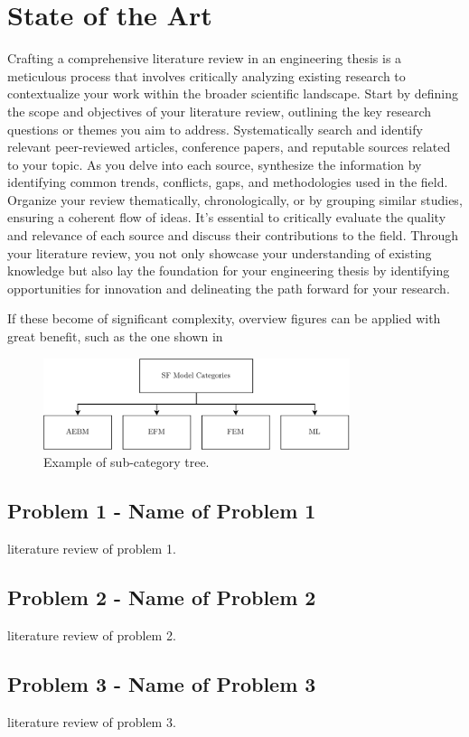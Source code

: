 \chapter{State of the Art} \label{ch:state-of-the-art}

Crafting a comprehensive literature review in an engineering thesis is a meticulous process that involves critically analyzing existing research to contextualize your work within the broader scientific landscape. Start by defining the scope and objectives of your literature review, outlining the key research questions or themes you aim to address. Systematically search and identify relevant peer-reviewed articles, conference papers, and reputable sources related to your topic. As you delve into each source, synthesize the information by identifying common trends, conflicts, gaps, and methodologies used in the field. Organize your review thematically, chronologically, or by grouping similar studies, ensuring a coherent flow of ideas. It's essential to critically evaluate the quality and relevance of each source and discuss their contributions to the field. Through your literature review, you not only showcase your understanding of existing knowledge but also lay the foundation for your engineering thesis by identifying opportunities for innovation and delineating the path forward for your research. \medskip

If these become of significant complexity, overview figures can be applied with great benefit, such as the one shown in~

\begin{figure}[h]
	\begin{small}
		\begin{center}
			\includegraphics[width=0.8\textwidth]{img/sf-categories.pdf}
		\end{center}
		\caption{Example of sub-category tree.}
		\label{fig:sota-example}
	\end{small}
\end{figure}


\section{Problem 1 - Name of Problem 1}\label{sec:lit-rev-problem-1}
literature review of problem 1.

\section{Problem 2 - Name of Problem 2}\label{sec:lit-rev-problem-2}
literature review of problem 2.

\section{Problem 3 - Name of Problem 3}\label{sec:lit-rev-problem-3}
literature review of problem 3.
